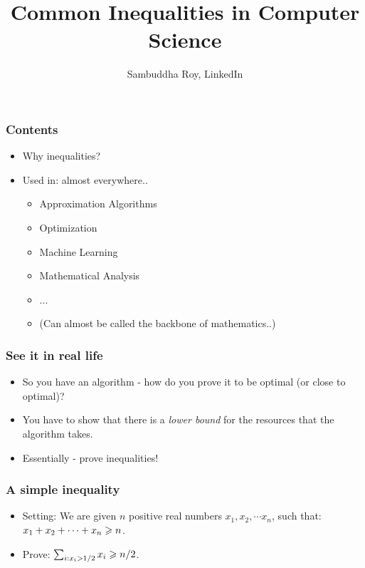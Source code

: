 \documentclass{beamer}
\title[IISc., July 7, 2016] %
{Common Inequalities in Computer Science}
\author{Sambuddha Roy, LinkedIn}
\begin{document}
\begin{frame}
  \titlepage
\end{frame}

\begin{frame}
\frametitle{Contents}
\begin{itemize}
\item Why inequalities?
\item Used in: almost everywhere..
\pause
\begin{itemize}
\item Approximation Algorithms \pause 
\item Optimization \pause
\item Machine Learning \pause
\item Mathematical Analysis \pause
\item ...
\pause
\item (Can almost be called the backbone of mathematics..)
\end{itemize}
\end{itemize}
\end{frame}

\begin{frame}
\frametitle{See it in real life}
\begin{itemize}
\item So you have an algorithm - how do you prove it to be optimal (or close to optimal)?
\pause
\item You have to show that there is a {\em lower bound} for the resources that the algorithm 
takes.
\pause
\item Essentially - prove inequalities!
\end{itemize}
\end{frame}

\begin{frame}
\frametitle{A simple inequality}
\begin{itemize}
\item Setting: We are given $n$ positive real numbers $x_1, x_2, \cdots x_n$, such that:
$x_1 + x_2 + \cdots + x_n \geqslant n$. 
\item Prove: $\sum_{i: x_i > 1/2} x_i \geqslant n/2$. 
\end{itemize}
\end{frame}
\end{document}
